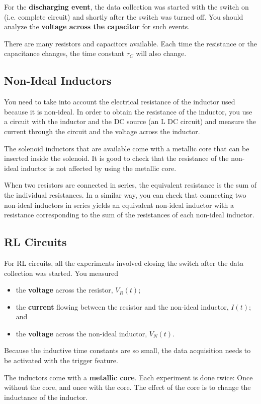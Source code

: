 For the \textbf{discharging event}, the data collection was started with the switch on (i.e. complete circuit) and shortly after the switch was turned off. You should analyze the \textbf{voltage across the capacitor} for such events.

There are many resistors and capacitors available. Each time the resistance or the capacitance changes, the time constant $\tau_{C}$ will also change.
%
\subsection{Non-Ideal Inductors}
%
You need to take into account the electrical resistance of the inductor used because it is non-ideal. In order to obtain the resistance of the inductor, you use a circuit with the inductor and the DC source (an L DC circuit) and measure the current through the circuit and the voltage across the inductor.

The solenoid inductors that are available come with a metallic core that can be inserted inside the solenoid. It is good to check that the resistance of the non-ideal inductor is not affected by using the metallic core.

When two resistors are connected in series, the equivalent resistance is the sum of the individual resistances. In a similar way, you can check that connecting two non-ideal inductors in series yields an equivalent non-ideal inductor with a resistance corresponding to the sum of the resistances of each non-ideal inductor.
%
\subsection{RL Circuits}
%
For RL circuits, all the experiments involved closing the switch after the data collection was started. You measured
\begin{itemize}
    \item the \textbf{voltage} across the resistor, $V_{R}(t)$;
    \item the \textbf{current} flowing between the resistor and the non-ideal inductor, $I(t)$; and
    \item the \textbf{voltage} across the non-ideal inductor, $V_{N}(t)$.
\end{itemize}
Because the inductive time constants are so small, the data acquisition needs to be activated with the trigger feature.

The inductors come with a \textbf{metallic core}. Each experiment is done twice: Once without the core, and once with the core. The effect of the core is to change the inductance of the inductor.

